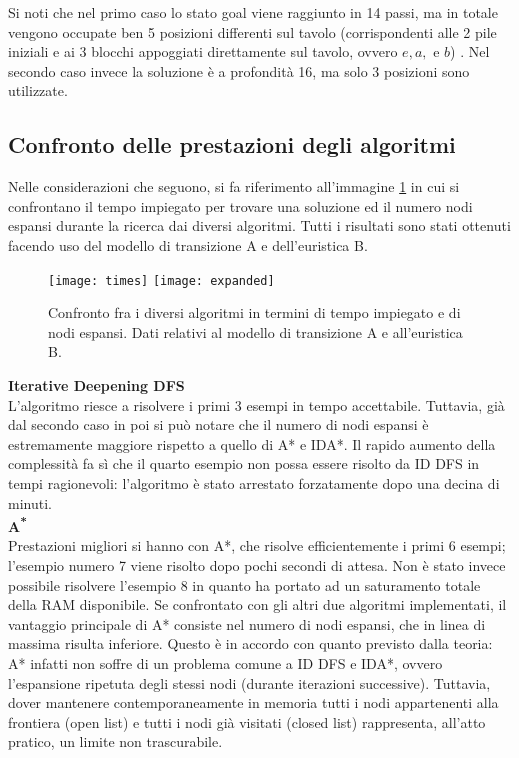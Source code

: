 Si noti che nel primo caso lo stato goal viene raggiunto in 14 passi, ma in totale vengono occupate ben 5 posizioni differenti sul tavolo (corrispondenti alle 2 pile iniziali e ai 3 blocchi appoggiati direttamente sul tavolo, ovvero $e,a,$ e $b$) . Nel secondo caso invece la soluzione è a profondità 16, ma solo 3 posizioni sono utilizzate.

\subsection{Confronto delle prestazioni degli algoritmi}
Nelle considerazioni che seguono, si fa riferimento all'immagine \ref{normal_compare} in cui si confrontano il tempo impiegato per trovare una soluzione ed il numero nodi espansi durante la ricerca dai diversi algoritmi. Tutti i risultati sono stati ottenuti facendo uso del modello di transizione A e dell'euristica B.\\

\begin{figure}[h]
\centering
\texttt{[image: times]}
\vskip 20pt
\texttt{[image: expanded]}
\caption{Confronto fra i diversi algoritmi in termini di tempo impiegato e di nodi espansi. Dati relativi al modello di transizione A e all'euristica B.}
\label{normal_compare}
\end{figure}

\noindent\textbf{Iterative Deepening DFS}\\
L'algoritmo  riesce a risolvere i primi 3 esempi in tempo accettabile. Tuttavia, già dal secondo caso in poi si può notare che il numero di nodi espansi è estremamente maggiore rispetto a quello di A* e IDA*. Il rapido aumento della complessità fa sì che il quarto esempio non possa essere risolto da ID DFS in tempi ragionevoli: l'algoritmo è stato arrestato forzatamente dopo una decina di minuti.\\

\noindent\textbf{\textbf{A\textsuperscript{*}}}\\
Prestazioni migliori si hanno con A*, che risolve efficientemente i primi 6 esempi; l'esempio numero 7 viene risolto dopo pochi secondi di attesa. Non è stato invece possibile risolvere l'esempio 8 in quanto ha portato ad un saturamento totale della RAM disponibile.
Se confrontato con gli altri due algoritmi implementati, il vantaggio principale di A* consiste nel numero di nodi espansi, che in linea di massima risulta inferiore. Questo è in accordo con quanto previsto dalla teoria: A* infatti non soffre di un problema comune a ID DFS e IDA*, ovvero l'espansione ripetuta degli stessi nodi (durante iterazioni successive). Tuttavia, dover mantenere contemporaneamente in memoria tutti i nodi appartenenti alla frontiera (open list) e tutti i nodi già visitati (closed list) rappresenta, all'atto pratico, un limite non trascurabile.\\

